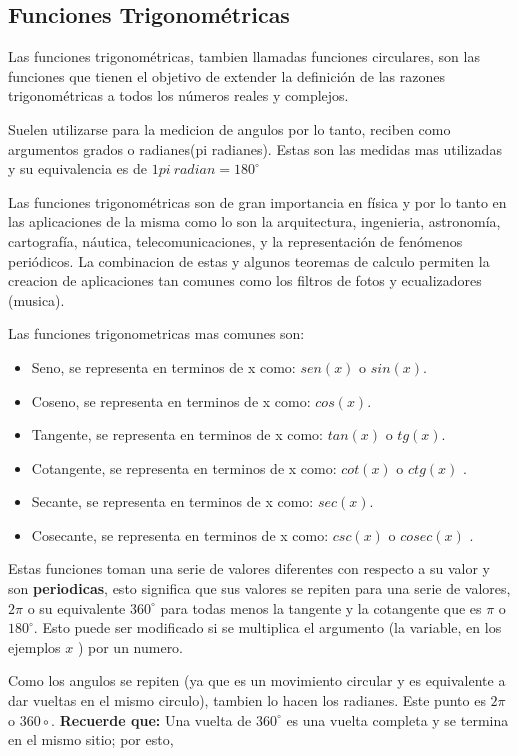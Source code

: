 \subsection{Funciones Trigonométricas}

Las funciones trigonométricas, tambien llamadas funciones circulares, son las
funciones que tienen el objetivo de
extender la definición de las razones trigonométricas a todos los números
reales y complejos.

Suelen utilizarse para la medicion de angulos por lo tanto, reciben como
argumentos grados o radianes(pi radianes). Estas son las medidas mas utilizadas
y su equivalencia es de $ 1 pi\ radian = 180^\circ $

Las funciones trigonométricas son de gran importancia en física y por lo tanto
en las aplicaciones de la misma como lo son la arquitectura, ingenieria, astronomía,
cartografía, náutica, telecomunicaciones, y la representación de fenómenos
periódicos. La combinacion de estas y algunos teoremas de calculo permiten la
creacion de aplicaciones tan comunes como los filtros de fotos y ecualizadores
(musica).

Las funciones trigonometricas mas comunes son:
\begin{itemize}
    \item Seno, se representa en terminos de x como: $ sen(x) $ o $ sin(x) $.
    \item Coseno, se representa en terminos de x como: $cos(x)$.
    \item Tangente, se representa en terminos de x como: $ tan(x) $ o $ tg(x) $.
    \item Cotangente, se representa en terminos de x como: $ cot(x) $ o $ ctg(x) $  .
    \item Secante, se representa en terminos de x como: $ sec(x) $.
    \item Cosecante, se representa en terminos de x como: $ csc(x) $ o $ cosec(x) $  .
\end{itemize}

Estas funciones toman una serie de valores diferentes con respecto a su valor y
son \textbf{periodicas}, esto significa que sus valores se repiten para una serie
de valores,  $2\pi $  o su equivalente $ 360^\circ $ para todas menos la tangente
y la cotangente que es $\pi$ o $180^\circ$. Esto puede ser
modificado si se multiplica el argumento (la variable, en los ejemplos $ x $  )
por un numero.

Como los angulos se repiten (ya que es un movimiento circular y es equivalente a
dar vueltas en el mismo circulo), tambien lo hacen los radianes. Este punto es
$2\pi $ o $ 360\circ $. \textbf{Recuerde que:} Una vuelta de $ 360^\circ $ es una
vuelta completa y se termina en el mismo sitio; por esto,

